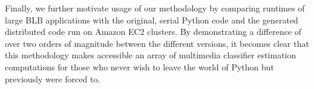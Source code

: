 Finally, we further motivate usage of our methodology by comparing runtimes of large BLB applications with the original, serial Python code and the generated distributed code run on Amazon EC2 clusters. By demonstrating a difference of over two orders of magnitude between the different versions, it becomes clear that this methodology makes accessible an array of multimedia classifier estimation computations for those who never wish to leave the world of Python but previously were forced to.




